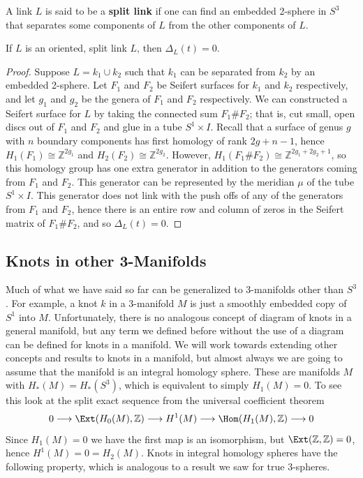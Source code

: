 A link $L$ is said to be a \textbf{split link} if one can find an embedded 2-sphere in $S^3$ that separates some components of $L$ from the other components of $L$.
\begin{prop}
If $L$ is an oriented, split link $L$, then $\Delta_L(t) = 0$.
\end{prop}
\begin{proof}
Suppose $L = k_1 \cup k_2$ such that $k_1$ can be separated from $k_2$ by an embedded 2-sphere. Let $F_1$ and $F_2$ be Seifert surfaces for $k_1$ and $k_2$ respectively, and let $g_1$ and $g_2$ be the genera of $F_1$ and $F_2$ respectively. We can constructed a Seifert surface for $L$ by taking the connected sum $F_1 \# F_2$; that is, cut small, open discs out of $F_1$ and $F_2$ and glue in a tube $S^1 \times I$. Recall that a surface of genus $g$ with $n$ boundary components has first homology of rank $2g+n-1$, hence $H_1(F_1) \cong \mathbb Z^{2g_1}$ and $H_2(F_2) \cong \mathbb Z^{2g_2}$. However, $H_1(F_1 \# F_2) \cong \mathbb Z^{2g_1+2g_2+1}$, so this homology group has one extra generator in addition to the generators coming from $F_1$ and $F_2$. This generator can be represented by the meridian $\mu$ of the tube $S^1 \times I$. This generator does not link with the push offs of any of the generators from $F_1$ and $F_2$, hence there is an entire row and column of zeros in the Seifert matrix of $F_1 \# F_2$, and so $\Delta_L(t)=0$.
\end{proof}








\subsection{Knots in other 3-Manifolds}
\label{Knots in other 3-Manifolds}


Much of what we have said so far can be generalized to 3-manifolds other than $S^3$. For example, a knot $k$ in a 3-manifold $M$ is just a smoothly embedded copy of $S^1$ into $M$. Unfortunately, there is no analogous concept of diagram of knots in a general manifold, but any term we defined before without the use of a diagram can be defined for knots in a manifold. We will work towards extending other concepts and results to knots in a manifold, but almost always we are going to assume that the manifold is an integral homology sphere. These are manifolds $M$ with $H_*(M) = H_*(S^3)$, which is equivalent to simply $H_1(M)=0$. To see this look at the split exact sequence from the universal coefficient theorem
\[ 0 \longrightarrow \Ext(H_0(M),\mathbb Z) \longrightarrow H^1(M) \longrightarrow \Hom(H_1(M),\mathbb Z) \longrightarrow 0 \]
Since $H_1(M)=0$ we have the first map is an isomorphism, but $\Ext(\mathbb Z,\mathbb Z)=0$, hence $H^1(M)=0=H_2(M)$. Knots in integral homology spheres have the following property, which is analogous to a result we saw for true 3-spheres.

